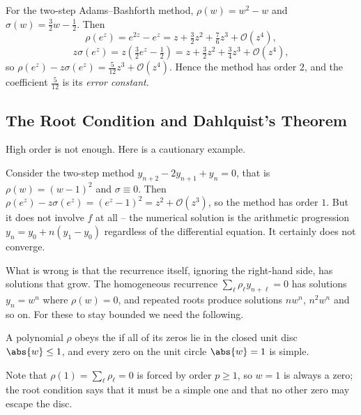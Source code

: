 \begin{example}
  For the two-step Adams--Bashforth method, $\rho(w) = w^2 - w$ and $\sigma(w) = \tfrac32 w - \tfrac12$. Then
  $$
  \rho(e^z) = e^{2z} - e^z = z + \tfrac32 z^2 + \tfrac76 z^3 + \mathcal{O}(z^4),
  $$
  $$
  z\sigma(e^z) = z\left(\tfrac32 e^z - \tfrac12\right) = z + \tfrac32 z^2 + \tfrac34 z^3 + \mathcal{O}(z^4),
  $$
  so $\rho(e^z) - z\sigma(e^z) = \tfrac{5}{12}z^3 + \mathcal{O}(z^4)$. Hence the method has order $2$, and the coefficient $\tfrac{5}{12}$ is its \emph{error constant}.
\end{example}

\subsection{The Root Condition and Dahlquist's Theorem}

High order is not enough. Here is a cautionary example.

\begin{example}
  Consider the two-step method $y_{n+2} - 2y_{n+1} + y_n = 0$, that is $\rho(w) = (w-1)^2$ and $\sigma \equiv 0$. Then $\rho(e^z) - z\sigma(e^z) = (e^z-1)^2 = z^2 + \mathcal{O}(z^3)$, so the method has order $1$. But it does not involve $f$ at all -- the numerical solution is the arithmetic progression $y_n = y_0 + n(y_1 - y_0)$ regardless of the differential equation. It certainly does not converge.
\end{example}

What is wrong is that the recurrence itself, ignoring the right-hand side, has solutions that grow. The homogeneous recurrence $\sum_\ell \rho_\ell y_{n+\ell} = 0$ has solutions $y_n = w^n$ where $\rho(w) = 0$, and repeated roots produce solutions $n w^n$, $n^2w^n$ and so on. For these to stay bounded we need the following.

\begin{definition}
  A polynomial $\rho$ obeys the  if all of its zeros lie in the closed unit disc $\abs{w}\leq 1$, and every zero on the unit circle $\abs{w} = 1$ is simple.
\end{definition}

Note that $\rho(1) = \sum_\ell \rho_\ell = 0$ is forced by order $p \geq 1$, so $w = 1$ is always a zero; the root condition says that it must be a simple one and that no other zero may escape the disc.

